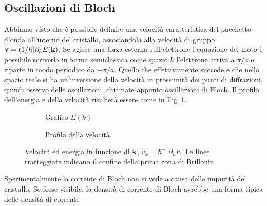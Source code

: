 \subsection{Oscillazioni di Bloch}



Abbiamo visto che è possibile definire una velocità caratteristica del pacchetto d'onda all'interno del cristallo, associandola alla velocità di gruppo ${\it\bf v} = (1/\hbar) \partial_kE({\it\bf k})$. Se agisce una forza esterna sull'elettrone l'equazione del moto è possibile scriverla in forma semiclassica come
spazio $k$ l'elettrone arriva a $\pi/a$ e riparte in modo periodico da $-\pi/a$. Quello che effettivamente succede è che nello spazio reale si ha un'inversione della velocità in prossimità dei punti di diffrazioni, quindi osservo delle oscillazioni, chiamate appunto oscillazioni di Bloch. Il profilo dell'energia e della velocità risulterà essere come in Fig~\ref{vel:en}.
\begin{figure}
	\centering
	\begin{subfigure}[b]{0.3\textwidth}
		\caption{Grafico $E(k)$}
	\end{subfigure}
	\qquad\quad
	\begin{subfigure}[b]{0.3\textwidth}
		\caption{Profilo della velocità}
	\end{subfigure}
	\caption{Velocità ed energia in funzione di  ${\it\bf k}$, $v_k = \hbar^{-1} \partial_k E$. Le linee tratteggiate indicano il confine della prima zona di Brillouin}
	\label{vel:en}
\end{figure}
Sperimentalmente la corrente di Bloch non si vede a causa delle impurità del cristallo. Se fosse visibile, la densità di corrente di Bloch avrebbe una forma tipica delle densità di corrente
